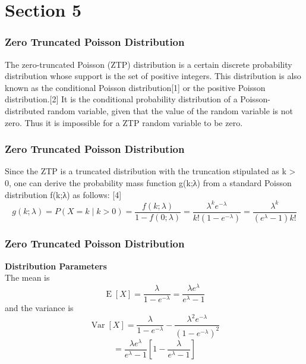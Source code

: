 

\section*{Section 5}
\begin{frame}
\frametitle{Zero Truncated Poisson Distribution}
\Large

The zero-truncated Poisson (ZTP) distribution is a certain discrete probability distribution whose support is the set of positive integers. This distribution is also known as the conditional Poisson distribution[1] or the positive Poisson distribution.[2] It is the conditional probability distribution of a Poisson-distributed random variable, given that the value of the random variable is not zero. Thus it is impossible for a ZTP random variable to be zero. 

\end{frame}
\begin{frame}
\frametitle{Zero Truncated Poisson Distribution}
\Large
Since the ZTP is a truncated distribution with the truncation stipulated as k > 0, one can derive the probability mass 
function g(k;λ) from a standard Poisson distribution f(k;λ) as follows: [4]
\[g(k;\lambda) = P(X = k \mid k > 0) = 
\frac{f(k;\lambda)}{1-f(0;\lambda)} = 
\frac{\lambda ^ k e^{- \lambda} }{k ! \left ( 1 - e^{- \lambda} \right )} = \frac{\lambda^k}{(e^\lambda-1)k!}\]

\end{frame}
\begin{frame}
	\frametitle{Zero Truncated Poisson Distribution}
	\Large
\textbf{Distribution Parameters}\\
The mean is
\[ \operatorname{E}[X]=\frac{\lambda}{1-e^{-\lambda}}=\frac{\lambda e^\lambda}{e^\lambda-1} \]
and the variance is
\[ \operatorname{Var}[X]=\frac{\lambda}{1-e^{-\lambda}} - \frac{\lambda^2 e^{-\lambda}}{(1-e^{-\lambda})^2}\] 
\[ = \frac{\lambda e^\lambda}{e^\lambda-1}\left[1-\frac{\lambda}{e^\lambda-1}\right] \]

\end{frame}

